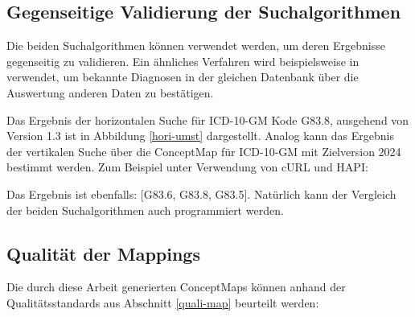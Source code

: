 \subsection{Gegenseitige Validierung der Suchalgorithmen}

Die beiden Suchalgorithmen können verwendet werden, um deren Ergebnisse gegenseitig zu validieren. Ein ähnliches Verfahren wird beispielsweise in \cite{intradbvalid} verwendet, um bekannte Diagnosen in der gleichen Datenbank über die Auswertung anderen Daten zu bestätigen.

Das Ergebnis der horizontalen Suche für ICD-10-GM Kode G83.8, ausgehend von Version 1.3 ist in Abbildung \ref{hori-umst} dargestellt. Analog kann das Ergebnis der vertikalen Suche über die ConceptMap für ICD-10-GM mit Zielversion 2024 bestimmt werden. Zum Beispiel unter Verwendung von cURL \cite{curl} und HAPI:

Das Ergebnis ist ebenfalls: [G83.6, G83.8, G83.5]. Natürlich kann der Vergleich der beiden Suchalgorithmen auch programmiert werden. 

\subsection{Qualität der Mappings}

Die durch diese Arbeit generierten ConceptMaps können anhand der Qualitätsstandards aus Abschnitt \ref{quali-map} beurteilt werden:

